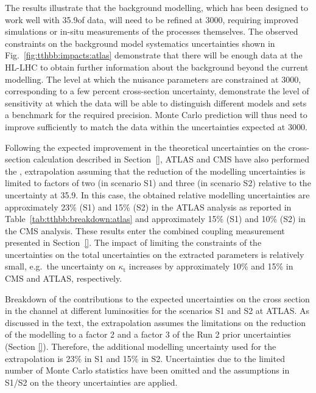 The results illustrate that the background modelling, which has been designed to work well with 35.9\Uifb of data, will need to be refined at 3000\Uifb, requiring improved simulations or in-situ measurements of the \ttHF processes themselves.
The observed constraints on the \ttHF background model systematics uncertainties shown in Fig.~\ref{fig:tthbb:impacts:atlas} demonstrate that there will be enough data at the HL-LHC to obtain further information about the background beyond the current modelling. The level at which the nuisance parameters are constrained at 3000\Uifb, corresponding to a few percent cross-section uncertainty, demonstrate the level of sensitivity at which the data will be able to distinguish different models and sets a benchmark for the required precision.
Monte Carlo prediction will thus need to improve sufficiently to match the data within the uncertainties expected at 3000\Uifb.

Following the expected improvement in the theoretical uncertainties on the \ttHF cross-section calculation described in Section~\ref{}, ATLAS and CMS have also performed the \ttH, \Htobb extrapolation assuming that the reduction of the \ttHF modelling uncertainties is limited to factors of two (in scenario S1) and three (in scenario S2) relative to the uncertainty at 35.9\Uifb.
In this case, the obtained relative \ttHF modelling uncertainties are approximately 23\% (S1) and 15\% (S2) in the ATLAS analysis as reported in Table~\ref{tab:tthbb:breakdown:atlas} and approximately 15\% (S1) and 10\% (S2) in the CMS analysis. These results enter the combined coupling measurement presented in Section~\ref{}. The impact of limiting the constraints of the \ttHF uncertainties on the total uncertainties on the extracted parameters is relatively small, e.g.\ the uncertainty on $\kappa_{\text{t}}$ increases by approximately 10\% and 15\% in CMS and ATLAS, respectively. 
\begin{table}
  \centering
  \caption{
    Breakdown of the contributions to the expected uncertainties on the \ttH cross section in the \Htobb channel at different luminosities for the scenarios S1 and S2 at ATLAS. As discussed in the text, the extrapolation assumes the limitations on the reduction of the \ttHF modelling to a factor 2 and a factor 3 of the Run 2 prior uncertainties (Section \ref{}).
    Therefore, the additional modelling uncertainty used for the extrapolation is 23\% in S1 and 15\% in S2.
    Uncertainties due to the limited number of Monte Carlo statistics have been omitted and the assumptions in S1/S2 on the theory uncertainties are applied.  
  }
  \label{tab:tthbb:breakdown:atlas}
\end{table}

